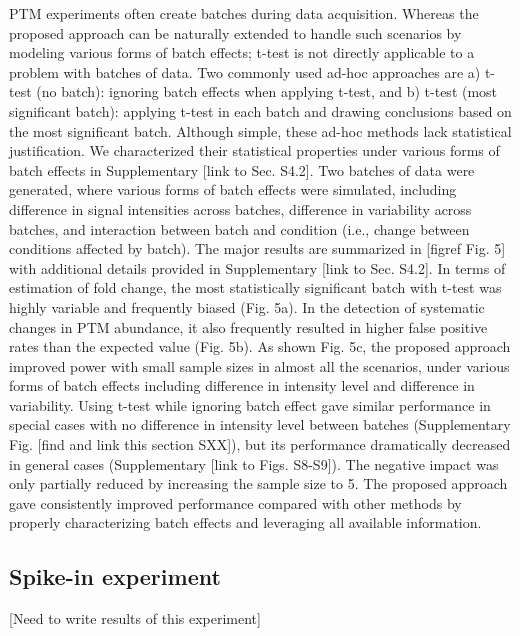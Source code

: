 \documentclass[mcp]{article}
\numberwithin{figure}{section} %
\numberwithin{table}{section}
\def\todo#1{{\color{red}[#1]}}
\begin{document}
PTM experiments often create batches during data acquisition. Whereas the proposed approach can be naturally extended to handle such scenarios by modeling various forms of batch effects; t-test is not directly applicable to a problem with batches of data. Two commonly used ad-hoc approaches are a) t-test (no batch): ignoring batch effects when applying t-test, and b) t-test (most significant batch): applying t-test in each batch and drawing conclusions based on the most significant batch. Although simple, these ad-hoc methods lack statistical justification. We characterized their statistical properties under various forms of batch effects in Supplementary \todo{link to Sec. S4.2}. Two batches of data were generated, where various forms of batch effects were simulated, including difference in signal intensities across batches, difference in variability across batches, and interaction between batch and condition (i.e., change between conditions affected by batch). 
The major results are summarized in \todo{figref Fig. 5} with additional details provided in Supplementary \todo{link to Sec. S4.2}. In terms of estimation of fold change, the most statistically significant batch with t-test was highly variable and frequently biased (Fig. 5a). In the detection of systematic changes in PTM abundance, it also frequently resulted in higher false positive rates than the expected value (Fig. 5b). As shown Fig. 5c, the proposed approach improved power with small sample sizes in almost all the scenarios, under various forms of batch effects including difference in intensity level and difference in variability. Using t-test while ignoring batch effect gave similar performance in special cases with no difference in intensity level between batches (Supplementary Fig. \todo{find and link this section SXX}), but its performance dramatically decreased in general cases (Supplementary \todo{link to Figs. S8-S9}). The negative impact was only partially reduced by increasing the sample size to 5. The proposed approach gave consistently improved performance compared with other methods by properly characterizing batch effects and leveraging all available information.

\subsection*{Spike-in experiment}
\todo{Need to write results of this experiment}
\end{document}
